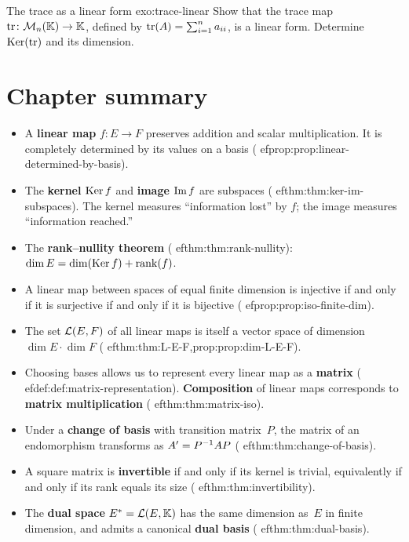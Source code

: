 \begin{exercise}{The trace as a linear form \basic}{exo:trace-linear}
Show that the trace map $\operatorname{tr}\colon\mathcal{M}_n({\mathbb{K}})\to{\mathbb{K}}$, defined by
$\operatorname{tr}(A) = \sum_{i=1}^n a_{ii}$, is a linear form.
Determine $\operatorname{Ker}(\operatorname{tr})$ and its dimension.
\end{exercise}


\section*{Chapter summary}\label{sec:summary-ch2}

\begin{itemize}
  \item A \textbf{linear map} $f\colon E\to F$
    preserves addition and scalar multiplication. It is completely
    determined by its values on a basis
    (
ef{prop:prop:linear-determined-by-basis}).

  \item The \textbf{kernel} $\operatorname{Ker} f$ and \textbf{image} $\operatorname{Im} f$ are
    subspaces (
ef{thm:thm:ker-im-subspaces}). The kernel measures
    ``information lost'' by $f$; the image measures ``information
    reached.''

  \item The \textbf{rank--nullity theorem}
    (
ef{thm:thm:rank-nullity}):
    $\dim E = \dim(\operatorname{Ker} f) + \operatorname{rank}(f)$.

  \item A linear map between spaces of equal finite dimension is
    injective if and only if it is surjective if and only if it is
    bijective (
ef{prop:prop:iso-finite-dim}).

  \item The set ${\mathcal{L}}(E,F)$ of all linear maps is itself a vector space
    of dimension $\dim E\cdot\dim F$
    (
ef{thm:thm:L-E-F,prop:prop:dim-L-E-F}).

  \item Choosing bases allows us to represent every linear map as a
    \textbf{matrix} (
ef{def:def:matrix-representation}).
    \textbf{Composition} of linear maps corresponds to
    \textbf{matrix multiplication}
    (
ef{thm:thm:matrix-iso}).

  \item Under a \textbf{change of basis} with transition matrix~$P$,
    the matrix of an endomorphism transforms as
    $A' = {P}^{-1}AP$ (
ef{thm:thm:change-of-basis}).

  \item A square matrix is \textbf{invertible} if and only if its
    kernel is trivial, equivalently if and only if its rank equals
    its size (
ef{thm:thm:invertibility}).

  \item The \textbf{dual space} $E^* = {\mathcal{L}}(E,{\mathbb{K}})$ has the same
    dimension as~$E$ in finite dimension, and admits a canonical
    \textbf{dual basis} (
ef{thm:thm:dual-basis}).
\end{itemize}
